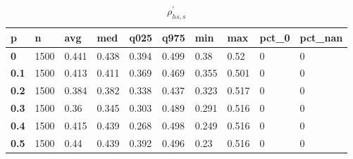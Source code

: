 \begin{table}[h]
 \centering 
\footnotesize
\caption{$\rho_{hs,s}^\prime $}
\label{tab:alphahss}
\begin{tabular}[h]{|l|l|l|l|l|l|l|l|l|l|
    } \hline
\textbf{ p} & \textbf{ n} & \textbf{ avg} & \textbf{ med} & \textbf{ q025} & \textbf{ q975} & \textbf{ min} & \textbf{ max} & \textbf{ pct\_0} & \textbf{ pct\_nan}
    \\ \hline
  \textbf{  0} & 1500 & 0.441 & 0.438 & 0.394 & 0.499 &  0.38 &  0.52 & 0 & 0
    \\ \hline
  \textbf{0.1} & 1500 & 0.413 & 0.411 & 0.369 & 0.469 & 0.355 & 0.501 & 0 & 0
    \\ \hline
  \textbf{0.2} & 1500 & 0.384 & 0.382 & 0.338 & 0.437 & 0.323 & 0.517 & 0 & 0
    \\ \hline
  \textbf{0.3} & 1500 &  0.36 & 0.345 & 0.303 & 0.489 & 0.291 & 0.516 & 0 & 0
    \\ \hline
  \textbf{0.4} & 1500 & 0.415 & 0.439 & 0.268 & 0.498 & 0.249 & 0.516 & 0 & 0
    \\ \hline
  \textbf{0.5} & 1500 &  0.44 & 0.439 & 0.392 & 0.496 &  0.23 & 0.516 & 0 & 0
    \\ \hline
 \end{tabular}
 \end{table}
